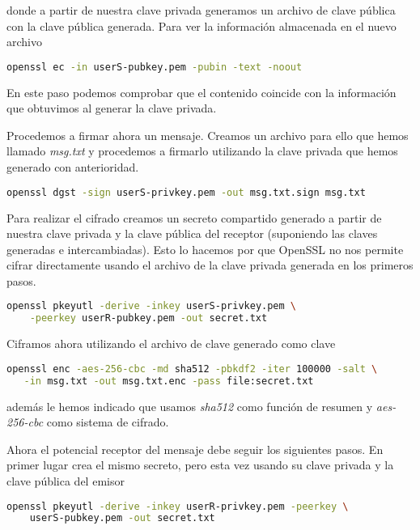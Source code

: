 \documentclass{article}
\begin{document}
donde a partir de nuestra clave privada generamos un archivo de clave pública
con la clave pública generada. Para ver la información almacenada en el nuevo
archivo 

\begin{lstlisting}[language=bash]
  openssl ec -in userS-pubkey.pem -pubin -text -noout
\end{lstlisting}

En este paso podemos comprobar  que el contenido coincide con la información que
obtuvimos al generar la clave privada.

Procedemos a firmar ahora un mensaje. Creamos un archivo para ello que hemos
llamado \textit{msg.txt} y procedemos a firmarlo utilizando la clave privada que
hemos generado con anterioridad.

\begin{lstlisting}[language=bash]
  openssl dgst -sign userS-privkey.pem -out msg.txt.sign msg.txt
\end{lstlisting}

Para realizar el cifrado creamos un secreto compartido generado a partir de nuestra clave
privada y la clave pública del receptor (suponiendo las claves generadas e intercambiadas). Esto lo hacemos por que OpenSSL no nos permite cifrar directamente
usando el archivo de la clave privada generada en los primeros pasos.

\begin{lstlisting}[language=bash]
  openssl pkeyutl -derive -inkey userS-privkey.pem \
    -peerkey userR-pubkey.pem -out secret.txt
\end{lstlisting}

Ciframos ahora utilizando el archivo de clave generado como clave

\begin{lstlisting}[language=bash]
  openssl enc -aes-256-cbc -md sha512 -pbkdf2 -iter 100000 -salt \
   -in msg.txt -out msg.txt.enc -pass file:secret.txt
\end{lstlisting}

además le hemos indicado que usamos \textit{sha512} como función de resumen y
\textit{aes-256-cbc} como sistema de cifrado.

Ahora el potencial receptor del mensaje debe seguir los siguientes pasos. En
primer lugar crea el mismo secreto, pero esta vez usando su clave privada y la clave pública del emisor

\begin{lstlisting}[language=bash]
  openssl pkeyutl -derive -inkey userR-privkey.pem -peerkey \
    userS-pubkey.pem -out secret.txt
\end{lstlisting}
\end{document}

